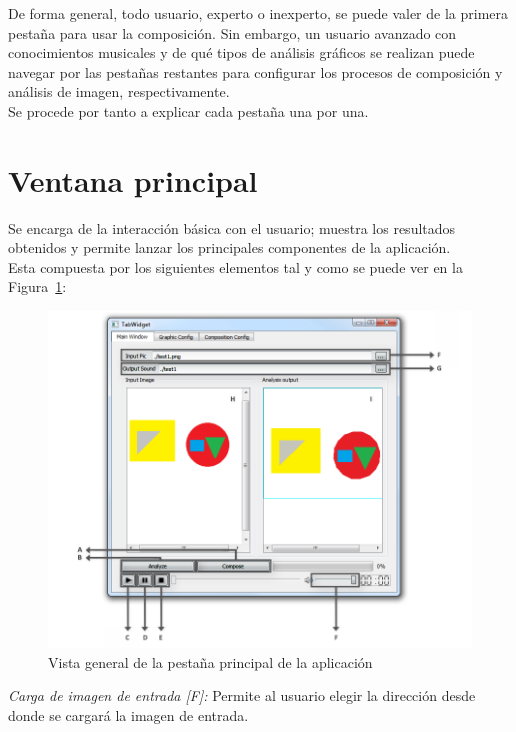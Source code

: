 		De forma general, todo usuario, experto o inexperto, se puede valer de la primera pestaña para usar la composición. Sin embargo, un usuario avanzado con conocimientos musicales y de qué tipos de análisis gráficos se realizan puede navegar por las pestañas restantes para configurar los procesos de composición y análisis de imagen, respectivamente.\\
		
		Se procede por tanto a explicar cada pestaña una por una.

	\section{Ventana principal}
		
		Se encarga de la interacción básica con el usuario; muestra los resultados obtenidos y permite lanzar los principales componentes de la aplicación. 
		\\Esta compuesta por los siguientes elementos tal y como se puede ver en la Figura~\ref{fig:interfaz}:\\
		
		
		\begin{figure}[htbp]
		\centering
		\hspace*{-0.9in}
		\includegraphics[scale=0.57]{graphics/interfaz.png}
		\caption{Vista general de la pestaña principal de la aplicación}
		\label{fig:interfaz}
		\end{figure}
		
		\noindent\textit{Carga de imagen de entrada [F]:} Permite al usuario elegir la dirección desde donde se cargará la imagen de entrada.\\
		
